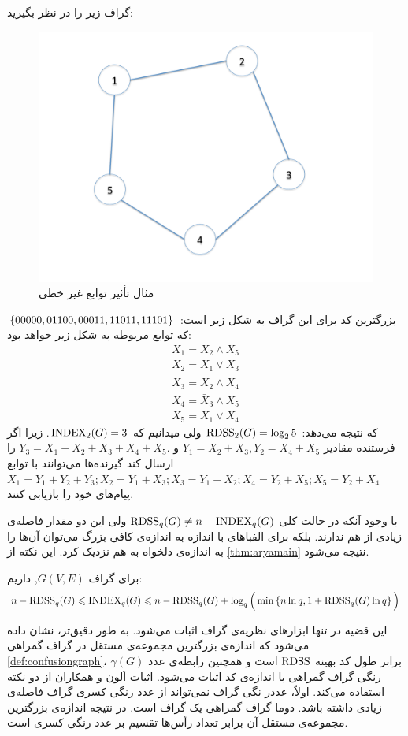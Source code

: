  \begin{example}
 	گراف زیر را در نظر بگیرید:
\begin{figure}[H]
	\centering
	\includegraphics[width=0.4\linewidth]{figs/chapter6/storage-graph-pent}
	\caption[مثال تأثیر توابع غیر خطی]{
		مثال تأثیر توابع غیر خطی
	\cite{arya}
	}
	\label{fig:storage-graph-pent}
\end{figure}
بزرگترین کد برای این گراف به شکل زیر است:
$\left\{ 00000,01100,00011,11011,11101 \right\}$
که توابع مربوطه به شکل زیر خواهد بود:
\begin{align*}
	X_1 = X_2 \wedge X_5 \\
	X_2 = X_1 \vee X_3 \\
	X_3 = X_2 \wedge \bar{X}_4 \\
	X_4 = \bar{X}_3 \wedge X_5 \\
	X_5 = X_1\vee X_4
\end{align*}
که نتیجه می‌دهد:
$\mathrm{RDSS}_2(G) = \log_2 5$
ولی میدانیم که
$\mathrm{INDEX}_2(G)=3$.
زیرا اگر فرستنده مقادیر
 $Y_1= X_2+X_3, Y_2= X_4+X_5$ 
 و
  $Y_3= X_1+X_2+X_3+X_4+X_5.$
  را ارسال کند گیرنده‌ها می‌توانند با توابع
  $X_1 = Y_1 + Y_2+Y_3; X_2 = Y_1+X_3; X_3 = Y_1+X_2; X_4 = Y_2+X_5; X_5 = Y_2+X_4$
  پیام‌های خود را بازیابی کنند.
 \end{example}
 
 با وجود آنکه در حالت کلی 
 $\mathrm{RDSS}_q(G) \ne n - \mathrm{INDEX}_q(G)$
 ولی این دو مقدار فاصله‌ی زیادی از هم ندارند. بلکه برای الفباهای با اندازه به اندازه‌ی کافی بزرگ می‌توان آن‌ها را به اندازه‌ی دلخواه به هم نزدیک کرد. این نکته از 
 \autoref{thm:aryamain}
 نتیجه می‌شود.
 \begin{theorem}\label{thm:aryamain}
 	برای گراف
 	 $G(V,E)$,
 	 داریم:
 	\begin{align}
 		n - \mathrm{RDSS}_q(G) \leqslant \mathrm{INDEX}_q(G) \leqslant n -\mathrm{RDSS}_q(G) + \log_q\Big(\min\left\{ n\ln q, 1+ \mathrm{RDSS}_q(G)\ln q  \right\}\Big)
 	\end{align}
 \end{theorem}
 
 این قضیه در
 \cite{4691014}
 تنها ابزارهای نظریه‌ی گراف اثبات می‌شود. به طور دقیق‌تر، نشان داده می‌شود که اندازه‌ی بزرگترین مجموعه‌ی مستقل در گراف گمراهی
 \autoref{def:confusiongraph}،
 $\gamma(G)$
 برابر طول کد بهینه
$\mathrm{RDSS}$
 است و همچنین رابطه‌ی عدد رنگی گراف گمراهی با اندازه‌ی کد
 \icod
 اثبات می‌شود. اثبات اَلون و همکاران از دو نکته استفاده می‌کند. اولاً، عددر نگی گراف نمی‌تواند از عدد رنگی کسری گراف فاصله‌ی زیادی داشته باشد. دوما گراف گمراهی یک گراف
 است. در نتیجه اندازه‌ی بزرگترین مجموعه‌ی مستقل آن برابر تعداد رأس‌ها تقسیم بر عدد رنگی کسری است.
 
